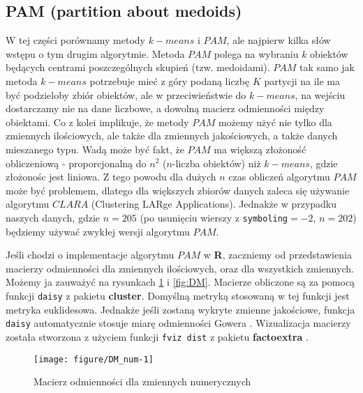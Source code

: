 \documentclass[12pt, a4paper]{article}\usepackage[]{graphicx}\usepackage[]{xcolor}
\makeatletter
\def\maxwidth{ %
  \ifdim\Gin@nat@width>\linewidth
    \linewidth
  \else
    \Gin@nat@width
  \fi
}
\newenvironment{knitrout}{}{} %
\makeatother
\begin{document}
\subsection{PAM (partition about medoids)}
W tej części porównamy metody $k-means$ i $PAM$, ale najpierw kilka słów wstępu o tym drugim algorytmie. Metoda $PAM$ polega na wybraniu $k$ obiektów będących centrami poszczególnych skupień (tzw. medoidami). $PAM$ tak samo jak metoda $k-means$ potrzebuje mieć z góry podaną liczbę $K$ partycji na ile ma być podzieloby zbiór obiektów, ale w przeciwieństwie do $k-means$, na wejściu dostarczamy nie na dane liczbowe, a dowolną macierz odmienności między obiektami. Co z kolei implikuje, że metody $PAM$ możemy użyć nie tylko dla zmiennych ilościowych, ale także dla zmiennych jakościowych, a także danych mieszanego typu. Wadą może być fakt, że $PAM$ ma większą złożoność obliczeniową - proporcjonalną do $n^2$ ($n$-liczba obiektów) niż $k-means$, gdzie złożonośc jest liniowa. Z tego powodu dla dużych $n$ czas obliczeń algorytmu $PAM$ może być problemem, dlatego dla większych zbiorów danych zaleca się używanie algorytmu $CLARA$ (Clustering LARge Applications). Jednakże w przypadku naszych danych, gdzie $n=205$ (po usunięciu wierszy z \texttt{symboling}$=-2$, $n=202$) będziemy używać zwykłej wersji algorytmu $PAM$.

\par
Jeśli chodzi o implementacje algorytmu $PAM$ w \textbf{R}, zaczniemy od przedstawienia macierzy odmienności dla zmiennych ilościowych, oraz dla wszystkich zmiennych. Możemy ja zauważyć na rysunkach \ref{fig:DM_num} i \ref{fig:DM}. Macierze obliczone są za pomocą funkcji \texttt{daisy} \cite{daisy} z pakietu \textbf{cluster}. Domyślną metryką stosowaną w tej funkcji jest metryka euklidesowa. Jednakże jeśli zostaną wykryte zmienne jakościowe, funkcja \texttt{daisy} automatycznie stosuje miarę odmienności Gowera \cite{Gower}. Wizualizacja macierzy została stworzona z użyciem funkcji \texttt{fviz dist} z pakietu \textbf{factoextra} \cite{factoextra}.

\begin{knitrout}
\color{fgcolor}\begin{figure}[H]

{\centering \texttt{[image: figure/DM\_num-1]} 

}

\caption[Macierz odmienności dla zmiennych numerycznych]{Macierz odmienności dla zmiennych numerycznych}\label{fig:DM_num}
\end{figure}

\end{knitrout}
\end{document}
